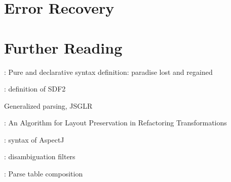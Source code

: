 \section{Error Recovery}

\cite{JongeKVS12}


\section{Further Reading}

\cite{KatsVW10}: Pure and declarative syntax definition: paradise lost and
regained

\cite{Vis97.thesis}: definition of SDF2

Generalized parsing, JSGLR 


\cite{JongeV11}: An Algorithm for Layout Preservation in Refactoring
Transformations

\cite{BravenboerTV06}: syntax of AspectJ

\cite{KlintV94,BrandSVV02}: disambiguation filters


\cite{BravenboerV08}: Parse table composition
